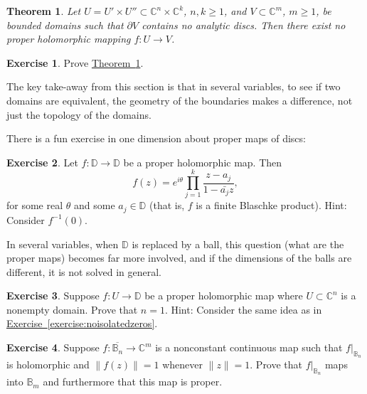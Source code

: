 \documentclass[12pt,openany]{book}
\newcommand{\snorm}[1]{\lVert {#1} \rVert}
\newcommand{\C}{{\mathbb{C}}}
\newcommand{\D}{{\mathbb{D}}}
\newcommand{\bB}{{\mathbb{B}}}
\newcommand{\bD}{{\mathbb{D}}}
\theoremstyle{plain}
\newtheorem{thm}{Theorem}[section]
\theoremstyle{remark}
\theoremstyle{definition}
\newenvironment{exbox}{%
    \def\FrameCommand{\vrule width 1pt \relax\hspace {10pt}}%
    \MakeFramed {\advance \hsize -\width \FrameRestore }%
}{%
    \endMakeFramed
}
\theoremstyle{exercise}
\newtheorem{exercise}{Exercise}[section]
\theoremstyle{example}
\newcommand{\exerciseref}[1]{\hyperref[#1]{Exercise~\ref*{#1}}}
\newcommand{\thmref}[1]{\hyperref[#1]{Theorem~\ref*{#1}}}
\begin{document}
\begin{thm} \label{thm:nopropmapprodandnodisc}
Let $U = U' \times U'' \subset \C^n \times \C^k$, $n,k \geq 1$, and $V
\subset \C^m$, $m \geq 1$, be bounded
domains such that $\partial V$ contains no analytic discs.
Then there exist no proper
holomorphic mapping $f \colon U \to V$.
\end{thm}

\begin{exbox}
\begin{exercise}
Prove \thmref{thm:nopropmapprodandnodisc}.
\end{exercise}
\end{exbox}

The key take-away from this section is that
in several variables, to see if two domains are equivalent,
the geometry 
of the boundaries makes a difference, not just the topology
of the domains.

There is a fun exercise in one dimension about proper maps of discs:

\begin{exbox}
\begin{exercise}
Let $f \colon \bD \to \bD$ be a proper holomorphic  map.  Then
\begin{equation*}
f(z) = 
e^{i\theta} \prod_{j=1}^k \frac{z-a_j}{1-\bar{a_j} z} ,
\end{equation*}
for some real $\theta$ and some $a_j \in \bD$ (that is, $f$ is a finite
Blaschke product).  Hint: Consider $f^{-1}(0)$.
\end{exercise}
\end{exbox}

In several variables, when $\D$ is replaced by a ball,
this question (what are the proper maps)
becomes far more involved, and if the dimensions of the balls are
different, it is not solved in general.

\begin{exbox}
\begin{exercise}
Suppose $f \colon U \to \bD$ be a proper holomorphic map where $U \subset
\C^n$ is a nonempty domain.  Prove that $n=1$.  Hint: Consider the same idea as in
\exerciseref{exercise:noisolatedzeros}.
\end{exercise}

\begin{exercise}
Suppose $f \colon \overline{\bB_n} \to \C^m$ is a nonconstant continuous
map such that $f|_{\bB_n}$ is holomorphic and $\snorm{f(z)} = 1$ whenever
$\snorm{z}=1$.  Prove that 
$f|_{\bB_n}$ maps into $\bB_m$ and furthermore that this map is proper.
\end{exercise}
\end{exbox}
\end{document}
